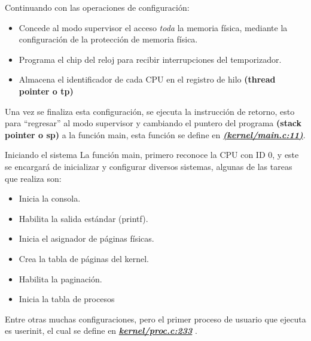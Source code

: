 \documentclass{libs/ufc_format}
\begin{document}
\begin{frame}{}
    Continuando con las operaciones de configuración:
    \begin{itemize}
        \item Concede al modo supervisor el acceso \emph{toda} la memoria física, mediante la configuración de la protección de memoria física.
        \item Programa el chip del reloj para recibir interrupciones del temporizador.
        \item Almacena el identificador de cada CPU en el registro de hilo \textbf{(thread pointer o tp)}
    \end{itemize}

    \vspace{0.3cm}

    Una vez se finaliza esta configuración, se ejecuta la instrucción de retorno, esto para “regresar” al modo supervisor y cambiando el puntero del programa \textbf{(stack pointer o sp)} a la función main, esta función se define en \href{https://github.com/CarlosSandoval-03/xv6-riscv/blob/riscv/kernel/main.c\#L11}{\textbf{\textit{(kernel/main.c:11)}}}. \cite{xv6_book} \cite{xv6}
\end{frame}
\begin{frame}{Iniciando el sistema}
    La función main, primero reconoce la CPU con ID 0, y este se encargará de inicializar y configurar diversos sistemas, algunas de las tareas que realiza son:

    \vspace{0.2cm}
    
    \begin{itemize}
        \item Inicia la consola.
        \item Habilita la salida estándar (printf).
        \item Inicia el asignador de páginas físicas.
        \item Crea la tabla de páginas del kernel.
        \item Habilita la paginación.
        \item Inicia la tabla de procesos
    \end{itemize}
    
    \vspace{0.2cm}

    Entre otras muchas configuraciones, pero el primer proceso de usuario que ejecuta es userinit, el cual se define en \href{https://github.com/CarlosSandoval-03/xv6-riscv/blob/riscv/kernel/proc.c\#L233}{\textbf{\textit{kernel/proc.c:233}}} \cite{xv6}.
\end{frame}
\end{document}
